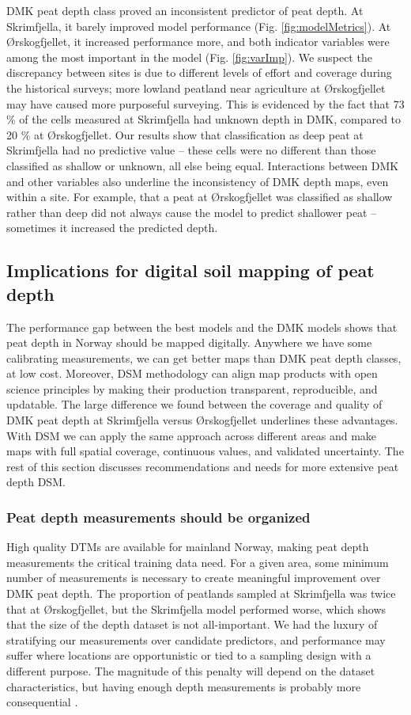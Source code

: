 \documentclass[soil, manuscript]{copernicus}
\begin{document}
DMK peat depth class proved an inconsistent predictor of peat depth.
At Skrimfjella, it barely improved model performance (Fig. \ref{fig:modelMetrics}).
At Ørskogfjellet, it increased performance more, and both indicator variables were among the most important in the model (Fig. \ref{fig:varImp}).
We suspect the discrepancy between sites is due to different levels of effort and coverage during the historical surveys; more lowland peatland near agriculture at Ørskogfjellet may have caused more purposeful surveying.
This is evidenced by the fact that 73 \% of the cells measured at Skrimfjella had unknown depth in DMK, compared to 20 \% at Ørskogfjellet.
Our results show that classification as deep peat at Skrimfjella had no predictive value -- these cells were no different than those classified as shallow or unknown, all else being equal.
Interactions between DMK and other variables also underline the inconsistency of DMK depth maps, even within a site.
For example, that a peat at Ørskogfjellet was classified as shallow rather than deep did not always cause the model to predict shallower peat -- sometimes it increased the predicted depth.

\subsection{Implications for digital soil mapping of peat depth}

The performance gap between the best models and the DMK models shows that peat depth in Norway should be mapped digitally.
Anywhere we have some calibrating measurements, we can get better maps than DMK peat depth classes, at low cost.
Moreover, DSM methodology can align map products with open science principles by making their production transparent, reproducible, and updatable.
The large difference we found between the coverage and quality of DMK peat depth at Skrimfjella versus Ørskogfjellet underlines these advantages.
With DSM we can apply the same approach across different areas and make maps with full spatial coverage, continuous values, and validated uncertainty.
The rest of this section discusses recommendations and needs for more extensive peat depth DSM.

\subsubsection{Peat depth measurements should be organized}

High quality DTMs are available for mainland Norway, making peat depth measurements the critical training data need.
For a given area, some minimum number of measurements is necessary to create meaningful improvement over DMK peat depth.
The proportion of peatlands sampled at Skrimfjella was twice that at Ørskogfjellet, but the Skrimfjella model performed worse, which shows that the size of the depth dataset is not all-important.
We had the luxury of stratifying our measurements over candidate predictors, and performance may suffer where locations are opportunistic or tied to a sampling design with a different purpose.
The magnitude of this penalty will depend on the dataset characteristics, but having enough depth measurements is probably more consequential \citep{wadouxSamplingDesignOptimization2019}.
\end{document}

